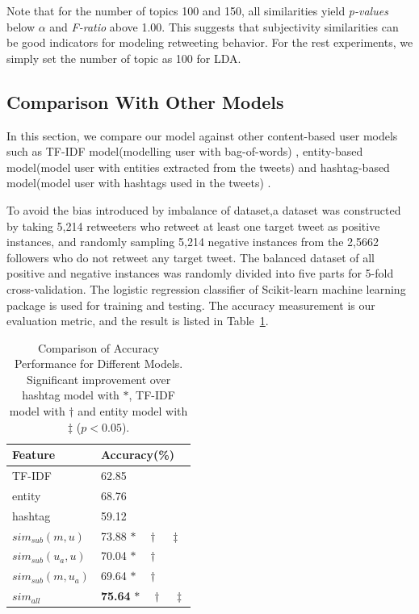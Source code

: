 \documentclass[letterpaper]{article}
\begin{document}
Note that for the number of topics 100 and 150, all similarities yield \textit{p-values} below $ \alpha $ and \textit{F-ratio} above 1.00. This suggests that subjectivity similarities can be good indicators for modeling retweeting behavior. 
For the rest experiments, we simply set the number of topic as 100 for LDA. 

\subsection{Comparison With Other Models}
\label{Comparison}

In this section, we compare our model against other content-based user models such as TF-IDF model(modelling user with bag-of-words) \cite{Luo:2013RMF}, entity-based model(model user with entities extracted from the tweets) and hashtag-based model(model user with hashtags used in the tweets) \cite{abel2011analyzing}.

To avoid the bias introduced by imbalance of dataset,a dataset was constructed by taking 5,214 retweeters who retweet at least one target tweet as positive instances, and randomly sampling 5,214 negative instances from the 2,5662 followers who do not retweet any target tweet.
The balanced dataset of all positive and negative instances was randomly divided into five parts for 5-fold cross-validation. 
The logistic regression classifier of Scikit-learn machine learning package \cite{scikit-learn} is used for training and testing.
The accuracy measurement is our evaluation metric, and the result is listed in Table~\ref{tab3}.
\begin{table}[h]
\centering
\caption{Comparison of Accuracy Performance  for Different Models. Significant improvement over hashtag model with $ \ast $, TF-IDF model with $ \dagger $ and entity model with $ \ddagger $ ($p < 0.05$).}
\label{tab3}
\begin{tabular}{|l|l|}
\hline
Feature & Accuracy(\%) \\
\hline
TF-IDF & 62.85   \\
entity & 68.76  \\
hashtag & 59.12  \\
$ sim_{sub} \left( m,u \right) $ & 73.88   $\ast \quad \dagger \quad \ddagger $\\
$ sim_{sub}\left( u_{a},u \right)  $ & 70.04   $\ast \quad \dagger $\\
$ sim_{sub}\left( m,u_{a} \right)  $ & 69.64   $\ast \quad \dagger $\\
$ sim_{all}  $ & \textbf{75.64}   $\ast \quad \dagger \quad \ddagger $\\
\hline
\end{tabular}
\end{table}
\end{document}
